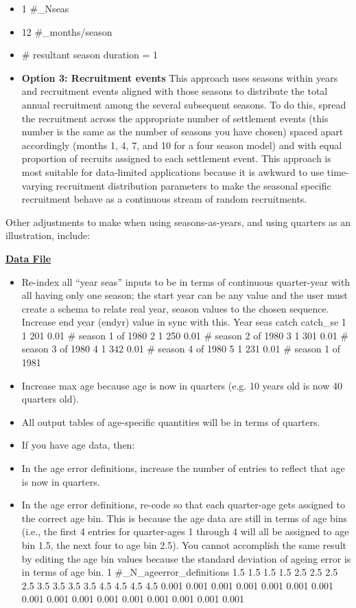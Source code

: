 \begin{itemize}
		\item 1 \#\_Nseas
		\item 12 \#\_months/season
		\item \# resultant season duration = 1
	\item \textbf{Option 3: Recruitment events}
	This approach uses seasons within years and recruitment events aligned with those seasons to distribute the total annual recruitment among the several subsequent seasons. To do this, spread the recruitment across the appropriate number of settlement events (this number is the same as the number of seasons you have chosen) spaced apart accordingly (months 1, 4, 7, and 10 for a four season model) and with equal proportion of recruits assigned to each settlement event. This approach is most suitable for data-limited applications because it is awkward to use time-varying recruitment distribution parameters to make the seasonal specific recruitment behave as a continuous stream of random recruitments.
\end{itemize}

Other adjustments to make when using seasons-as-years, and using quarters as an illustration, include:

\textbf{\underline{Data File}}
\begin{itemize}
	\item Re-index all “year seas” inputs to be in terms of continuous quarter-year with all having only one season; the start year can be any value and the user must create a schema to relate real year, season values to the chosen sequence. Increase end year (endyr) value in sync with this.
	Year seas  catch  catch\_se
	1    1     201    0.01     \# season 1 of 1980
	2    1     250    0.01     \# season 2 of 1980
	3    1     301    0.01     \# season 3 of 1980
	4    1     342    0.01     \# season 4 of 1980
	5    1     231    0.01     \# season 1 of 1981
	\item Increase max age because age is now in quarters (e.g. 10 years old is now 40 quarters old).
	\item All output tables of age-specific quantities will be in terms of quarters.
	\item If you have age data, then:
		\item In the age error definitions, increase the number of entries to reflect that age is now in quarters.
		\item In the age error definitions, re-code so that each quarter-age gets assigned to the correct age bin. This is because the age data are still in terms of age bins (i.e., the first 4 entries for quarter-ages 1 through 4 will all be assigned to age bin 1.5, the next four to age bin 2.5). You cannot accomplish the same result by editing the age bin values because the standard deviation of ageing error is in terms of age bin.
	    1 \#\_N\_ageerror\_definitions
		1.5 1.5 1.5 1.5 2.5 2.5 2.5 2.5 3.5 3.5 3.5 3.5 4.5 4.5 4.5 4.5
		0.001 0.001 0.001 0.001 0.001 0.001 0.001 0.001 0.001 0.001 0.001 0.001 0.001 0.001 0.001 0.001
\end{itemize}

